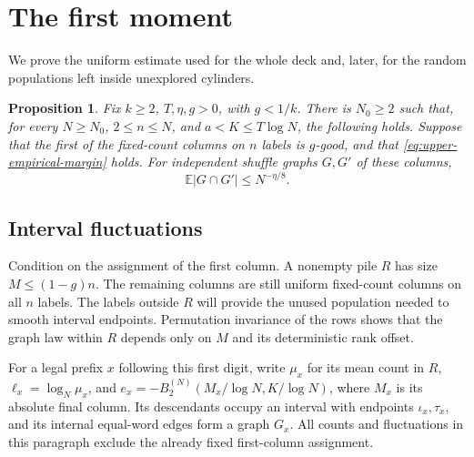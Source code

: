 \documentclass[11pt]{article}
\numberwithin{equation}{section}
\newtheorem{proposition}[theorem]{Proposition}
\theoremstyle{definition}
\theoremstyle{remark}
\newcommand{\E}{\mathbb E}
\newcommand{\1}{\mathbf 1}
\begin{document}
\section{The first moment}\label{sec:upper-first}
We prove the uniform estimate used for the whole deck and, later, for
the random populations left inside unexplored cylinders.

\begin{proposition}%
\label{prop:upper-first}
Fix $k\ge2$, $T,\eta,g>0$, with $g<1/k$. There is $N_0\ge2$ such
that, for every $N\ge N_0$, $2\le n\le N$, and
$a<K\le T\log N$, the following holds. Suppose that the first of
the fixed-count columns on $n$ labels is $g$-good, and that
\eqref{eq:upper-empirical-margin} holds. For independent shuffle
graphs $G,G'$ of these columns,
\begin{equation}\label{eq:upper-first}
 \E|G\cap G'|\le N^{-\eta/8}.
\end{equation}
\end{proposition}

\subsection{Interval fluctuations}
Condition on the assignment of the first column. A nonempty pile
$R$ has size $M\le(1-g)n$. The remaining columns are still uniform
fixed-count columns on all $n$ labels. The labels outside $R$ will
provide the unused population needed to smooth interval endpoints.
Permutation invariance of the rows shows that the graph law within
$R$ depends only on $M$ and its deterministic rank offset.

For a legal prefix $x$ following this first digit, write $\mu_x$ for
its mean count in $R$, $\ell_x=\log_N\mu_x$, and
$e_x=-B^{(N)}_2(M_x/\log N,K/\log N)$, where $M_x$ is its absolute final column.
Its descendants occupy an interval with endpoints $\iota_x,\tau_x$,
and its internal equal-word edges form a graph $G_x$.
All counts and fluctuations in this paragraph exclude the already
fixed first-column assignment.
\end{document}
